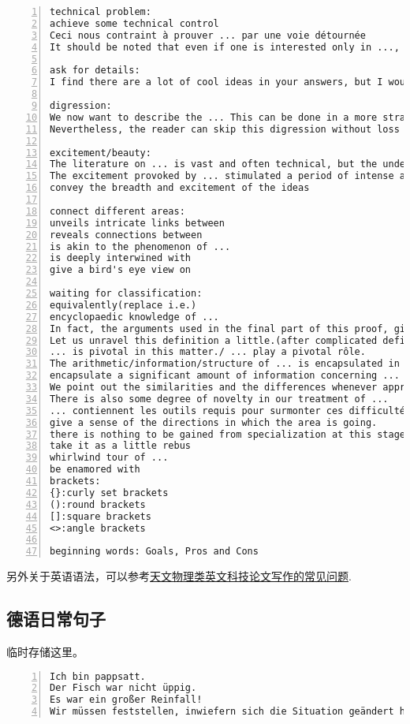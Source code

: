 \documentclass[11pt]{amsart}
\begin{document}
\begin{lstlisting}[numbers=left,numberstyle=\tiny,numbersep=10pt]
technical problem:
achieve some technical control
Ceci nous contraint à prouver ... par une voie détournée
It should be noted that even if one is interested only in ..., the proofs often involve more general ...

ask for details:
I find there are a lot of cool ideas in your answers, but I would be grateful if you could be a bit more precise.

digression:
We now want to describe the ... This can be done in a more straightforward way, but we prefer to include a short digression in ... theory as this allows us to mention a general fact which is in the background of a later construction anyhow.
Nevertheless, the reader can skip this digression without loss of continuity and continue with ... instead.

excitement/beauty:
The literature on ... is vast and often technical, but the underlying ideas are possessing of an undeniable beauty.
The excitement provoked by ... stimulated a period of intense and widespread activity.
convey the breadth and excitement of the ideas

connect different areas:
unveils intricate links between
reveals connections between
is akin to the phenomenon of ...
is deeply interwined with
give a bird's eye view on

waiting for classification:
equivalently(replace i.e.)
encyclopaedic knowledge of ...
In fact, the arguments used in the final part of this proof, give the following result.
Let us unravel this definition a little.(after complicated definition)
... is pivotal in this matter./ ... play a pivotal rôle. 
The arithmetic/information/structure of ... is encapsulated in ...
encapsulate a significant amount of information concerning ...
We point out the similarities and the differences whenever appropriate.
There is also some degree of novelty in our treatment of ...
... contiennent les outils requis pour surmonter ces difficultés.
give a sense of the directions in which the area is going.
there is nothing to be gained from specialization at this stage
take it as a little rebus
whirlwind tour of ...
be enamored with
brackets:
{}:curly set brackets
():round brackets
[]:square brackets
<>:angle brackets

beginning words: Goals, Pros and Cons
\end{lstlisting}

另外关于英语语法，可以参考\href{https://arxiv.org/ftp/arxiv/papers/1011/1011.5973.pdf}{天文物理类英文科技论文写作的常见问题}.
\subsection{德语日常句子}
临时存储这里。
\begin{lstlisting}[numbers=left,numberstyle=\tiny,numbersep=10pt]
Ich bin pappsatt.
Der Fisch war nicht üppig.
Es war ein großer Reinfall!
Wir müssen feststellen, inwiefern sich die Situation geändert hat.
\end{lstlisting}
\end{document}
